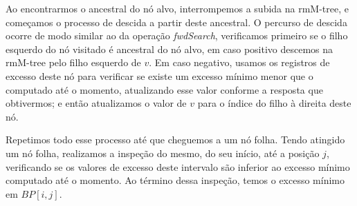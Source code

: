     Ao encontrarmos o ancestral do nó alvo, interrompemos a subida na rmM-tree, e começamos o processo de descida a partir deste ancestral. O percurso de descida ocorre de modo similar ao da operação \textit{fwdSearch}, verificamos primeiro se o filho  esquerdo do nó visitado é ancestral do nó alvo, em caso positivo descemos na rmM-tree pelo filho esquerdo de $v$.  Em caso negativo, usamos os registros de excesso deste nó para verificar se existe um excesso mínimo menor que o computado até o momento, atualizando esse valor conforme a resposta que obtivermos; e então atualizamos o valor de $v$ para o índice do filho à direita deste nó. 

    Repetimos todo esse processo até que cheguemos a um nó folha. Tendo atingido um nó folha, realizamos a inspeção do mesmo, do seu início, até a posição $j$, verificando se os valores de excesso deste intervalo são inferior ao excesso mínimo computado até o momento. Ao término dessa inspeção, temos o excesso mínimo em $BP[i,j]$.


